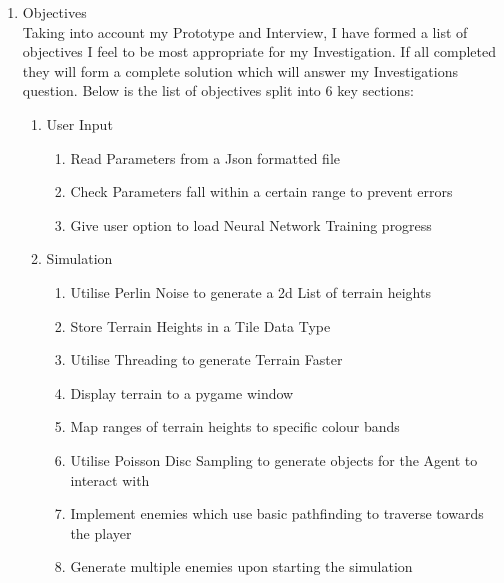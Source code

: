 \begin{flushleft}
\begin{enumerate}
            \begin{enumerate}
                \item 
            \end{enumerate}

            \pagebreak
        \item {\Large Objectives} \\
            \large
            Taking into account my Prototype and Interview, I have formed a list of objectives I feel to be most 
            appropriate for my Investigation.
            If all completed they will form a complete solution which will answer my Investigations question.
            Below is the list of objectives split into 6 key sections:

            \begin{enumerate}
                \item User Input
                    \begin{enumerate}
                        \item Read Parameters from a Json formatted file
                        \item Check Parameters fall within a certain range to prevent errors
                        \item Give user option to load Neural Network Training progress
                    \end{enumerate}
                \item Simulation
                    \begin{enumerate}
                        \item Utilise Perlin Noise to generate a 2d List of terrain heights
                        \item Store Terrain Heights in a Tile Data Type
                        \item Utilise Threading to generate Terrain Faster
                        \item Display terrain to a pygame window
                        \item Map ranges of terrain heights to specific colour bands
                        \item Utilise Poisson Disc Sampling to generate objects for the Agent to interact with
                        \item Implement enemies which use basic pathfinding to traverse towards the player
                        \item Generate multiple enemies upon starting the simulation

\end{enumerate}
\end{enumerate}
\end{enumerate}
\end{flushleft}
